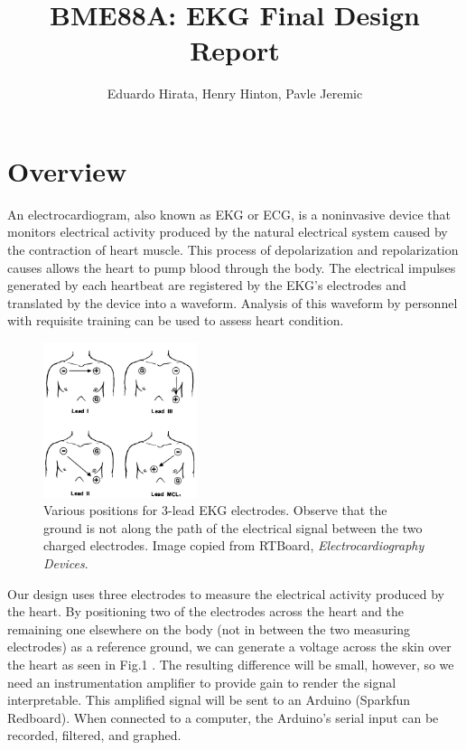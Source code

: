 \documentclass[11pt, oneside]{article}   	%
\title{BME88A: EKG Final Design Report}
\author{Eduardo Hirata, Henry Hinton, Pavle Jeremic}
\begin{document}
\maketitle

\pagebreak
\section{Overview}
	
	\onehalfspace

\par An electrocardiogram, also known as EKG or ECG, is a noninvasive device that monitors electrical activity produced by the natural electrical system caused by the contraction of heart muscle. This process of depolarization and repolarization causes allows the heart to pump blood through the body. The electrical impulses generated by each heartbeat are registered by the EKG's electrodes and translated by the device into a waveform. Analysis of this waveform by personnel with requisite training can be used to assess heart condition.
 

\begin{figure}
	\includegraphics[width=0.4\textwidth]{ecg}
	\caption{Various positions for 3-lead EKG electrodes. Observe that the ground is not along the path of the electrical signal between the two charged electrodes. \cite{ecgpos} Image copied from RTBoard, \textit{Electrocardiography Devices}.}
\end{figure}

\par Our design uses three electrodes to measure the electrical activity produced by the heart. By positioning two of the electrodes across the heart and the remaining one elsewhere on the body (not in between the two measuring electrodes) as a reference ground, we can generate a voltage across the skin over the heart as seen in Fig.1 . The resulting difference will be small, however, so we need an instrumentation amplifier to provide gain to render the signal interpretable. This amplified signal will be sent to an Arduino (Sparkfun Redboard). When connected to a computer, the Arduino's serial input can be recorded, filtered, and graphed.
\end{document}
